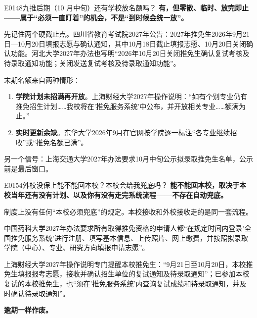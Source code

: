 \begin{qa}{E0148}{九推后期（10 月中旬）还有学校放名额吗？}
\textbf{有，但零散、临时、放完即止——属于“必须一直盯着”的机会，不是“到时候会统一放”。}

先记住两个硬截止点。四川省教育考试院2027年公告：2027年推免生2026年9月21日—10月20日填报志愿与确认通知，其中10月18日截止填报志愿、10月20日关闭确认功能。河北大学2027年办法也写明“2026年10月20日关闭推免生确认复试考核及待录取通知功能；关闭发送复试考核及待录取通知功能”。

末期名额来自两种情形：

\begin{enumerate}
  \item \textbf{学院计划未招满再开放}。上海财经大学2027年操作说明：“如有个别专业仍有推免招生计划……我校将在'推免服务系统'中公布，并开放相关专业……额满为止。”
  \item \textbf{实时更新余缺}。东华大学2026年9月在官网按学院逐一标注“各专业继续招收”或“推免名额已满”。
\end{enumerate}

另一个信号：上海交通大学2027年办法要求10月中旬公示拟录取推免生名单，公示前是最后窗口。
\end{qa}

\begin{qa}{E0154}{外校没保上能不能回本校？本校会给我兜底吗？}
\textbf{能不能回本校，取决于本校当年还有没有计划、以及你有没有走完系统流程——不存在自动兜底。}

制度上没有任何“本校必须兜底”的规定。本校接收和外校接收走的是同一套流程。

中国药科大学2027年办法要求所有取得推免资格的申请人都“在规定时间内登录'全国推免服务系统'进行注册、填写基本信息、上传照片、网上缴费，并按照拟录取学院（中心）、专业、研究方向填报申请志愿”。

上海财经大学2027年操作说明专门提醒本校推免生：“9月21日至10月20日，本校推免生填报报考志愿，接收并确认招生单位的复试通知及待录取通知”；已参加本校复试的本校推免生，也“须在'推免服务系统'内查询复试成绩和待录取通知，并及时确认待录取通知”。

\textbf{逾期一样作废。}
\end{qa}

